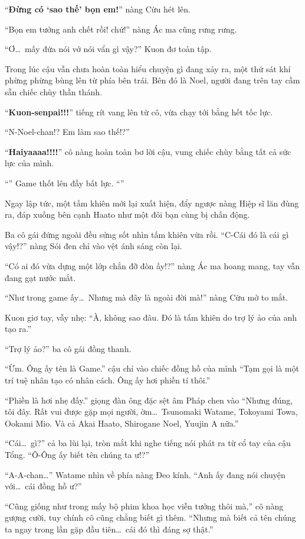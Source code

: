 \documentclass[../main.tex]{subfiles}
\begin{document}
``\textbf{Đừng có `sao thế' bọn em!}'' nàng Cừu hét lên.

``Bọn em tưởng anh chết rồi! chứ!'' nàng Ác ma cũng rưng rưng.

``Ơ\dots\ mấy đứa nói vớ nói vẩn gì vậy?'' Kuon đơ toàn tập.

Trong lúc cậu vẫn chưa hoàn toàn hiểu chuyện gì đang xảy ra, một thứ sát khí phừng phừng bùng lên từ phía bên trái. Bên đó là Noel, người đang trên tay cầm sẵn chiếc chùy thần thánh.

``\textbf{Kuon-senpai!!!}'' tiếng rít vang lên từ cô, vừa chạy tới bằng hết tốc lực.

``N-Noel-chan!? Em làm sao thế!?''

``\textbf{Haiyaaaa!!!!}'' cô nàng hoàn toàn bơ lời cậu, vung chiếc chùy bằng tất cả sức lực của mình.

``'' Game thốt lên đầy bất lực. ``''

Ngay lập tức, một tấm khiên mới lại xuất hiện, đẩy ngược nàng Hiệp sĩ lăn đùng ra, đáp xuống bên cạnh Haato như một đôi bạn cùng bị chấn động.

Ba cô gái đứng ngoài đều sửng sốt nhìn tấm khiên vừa rồi. ``C-Cái đó là cái gì vậy!?'' nàng Sói đen chỉ vào vệt ánh sáng còn lại.

``Có ai đó vừa dựng một lớp chắn đỡ đòn ấy!?'' nàng Ác ma hoang mang, tay vẫn đang gạt nước mắt.

``Như trong game ấy\dots\ Nhưng mà đây là ngoài đời mà!'' nàng Cừu mở to mắt.

Kuon giơ tay, vẫy nhẹ: ``À, không sao đâu. Đó là tấm khiên do trợ lý ảo của anh tạo ra.''

``Trợ lý ảo?'' ba cô gái đồng thanh.

``Ừm. Ông ấy tên là Game.'' cậu chỉ vào chiếc đồng hồ của mình ``Tạm gọi là một trí tuệ nhân tạo có nhân cách. Ông ấy hơi phiền tí thôi.''

``Phiền là hơi nhẹ đấy.'' giọng đàn ông đặc sệt âm Pháp chen vào ``Nhưng đúng, tôi đây. Rất vui được gặp mọi người, ờm\dots\ Tsunomaki Watame, Tokoyami Towa, Ookami Mio. Và cả Akai Haato, Shirogane Noel, Yuujin A nữa.''

``Cái\dots\ gì?'' cả ba lùi lại, tròn mắt khi nghe tiếng nói phát ra từ cổ tay của cậu Tổng. ``Ô-Ông ấy biết tên chúng ta ư!?''

``A-A-chan\dots'' Watame nhìn về phía nàng Đeo kính. ``Anh ấy đang nói chuyện với\dots\ cái đồng hồ ư?''

``Cũng giống như trong mấy bộ phim khoa học viễn tưởng thôi mà,'' cô nàng gượng cười, tuy chính cô cũng chẳng biết gì thêm. ``Nhưng mà biết cả tên chúng ta ngay trong lần gặp đầu tiên\dots\ cái đó thì đáng sợ thật.''
\end{document}
